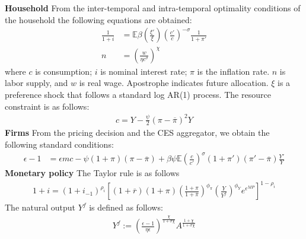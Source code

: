 \textbf{Household}\hspace{3mm} From the inter-temporal and intra-temporal optimality conditions of the household the following equations are obtained:
\begin{align*}
    \frac{1}{1+i} &= \mathbb{E} \beta \left(\frac{\xi'}{\xi}\right) \left(\frac{c'}{c}\right)^{-\sigma}\frac{1}{1+\pi'}
    \\
    n &= \left(\frac{w}{\eta c^{\sigma}}\right)^{\chi}
  \end{align*}
  where $c$ is consumption; $i$ is nominal interest rate; $\pi$ is the inflation rate. $n$ is labor supply, and $w$ is real wage. Apostrophe indicates future allocation.
  $\xi$ is a preference shock that follows a standard log AR(1) process.
  The resource constraint is as follows:
  \begin{align*}
    c = Y -\frac{\psi}{2} (\pi-\overline{\pi})^{2}Y
  \end{align*}
\textbf{Firms}\hspace{3mm} From the pricing decision and the CES aggregator, we obtain the following standard conditions:
  \begin{align*}
    \epsilon-1 &= \epsilon mc - \psi(1+\pi)(\pi-\overline{\pi}) +\beta\psi \mathbb{E}\left(\frac{c}{c'}\right)^{\sigma}(1+\pi')(\pi'-\overline{\pi})\frac{Y'}{Y}
  \end{align*}
  \textbf{Monetary policy}\hspace{3mm} %
  The Taylor rule is as follows
  \begin{align*}
    1+i = (1+i_{-1})^{\rho_{i}}\left[\left(1+\overline{r}\right)(1+\pi)\left(\frac{1+\pi}{1+\overline{\pi}}\right)^{\phi_{\pi}}
    \left(\frac{Y}{Y^{f}}\right)^{\phi_{Y}}
    e^{\epsilon^{MP}}\right]^{1-\rho_{i}}
  \end{align*}
  The natural output $Y^{f}$ is defined as follows:
  \begin{align*}
    Y^{f} 
    := \left(\frac{\epsilon-1}{\eta\epsilon}\right)^{\frac{\chi}{1+\sigma\chi}}A^{\frac{1+\chi}{1+\sigma\chi}} 
  \end{align*}
